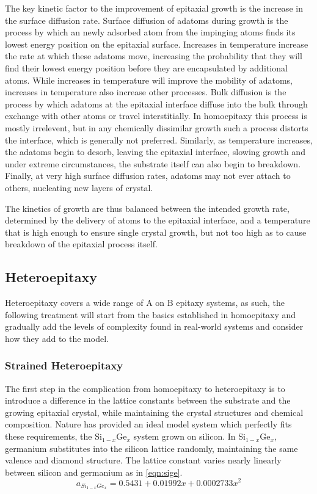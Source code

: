 The key kinetic factor to the improvement of epitaxial growth is the increase in the surface diffusion rate. Surface diffusion of adatoms during growth is the process by which an newly adsorbed atom from the impinging atoms finds its lowest energy position on the epitaxial surface. Increases in temperature increase the rate at which these adatoms move, increasing the probability that they will find their lowest energy position before they are encapsulated by additional atoms. While increases in temperature will improve the mobility of adatoms, increases in temperature also increase other processes. Bulk diffusion is the process by which adatoms at the epitaxial interface diffuse into the bulk through exchange with other atoms or travel interstitially. In homoepitaxy this process is mostly irrelevent, but in any chemically dissimilar growth such a process distorts the interface, which is generally not preferred. Similarly, as temperature increases, the adatoms begin to desorb, leaving the epitaxial interface, slowing growth and under extreme circumstances, the substrate itself can also begin to breakdown. Finally, at very high surface diffusion rates, adatoms may not ever attach to others, nucleating new layers of crystal.

The kinetics of growth are thus balanced between the intended growth rate, determined by the delivery of atoms to the epitaxial interface, and a temperature that is high enough to ensure single crystal growth, but not too high as to cause breakdown of the epitaxial process itself.

\subsection{Heteroepitaxy}
Heteroepitaxy covers a wide range of A on B epitaxy systems, as such, the following treatment will start from the basics established in homoepitaxy and gradually add the levels of complexity found in real-world systems and consider how they add to the model.

\subsubsection{Strained Heteroepitaxy}
The first step in the complication from homoepitaxy to heteroepitaxy is to introduce a difference in the lattice constants between the substrate and the growing epitaxial crystal, while maintaining the crystal structures and chemical composition. Nature has provided an ideal model system which perfectly fits these requirements, the Si$_{1-x}$Ge$_x$ system grown on silicon. In Si$_{1-x}$Ge$_x$, germanium substitutes into the silicon lattice randomly, maintaining the same valence and diamond structure. The lattice constant varies nearly linearly between silicon and germanium as in \cref{eqn:sige}.
\begin{equation}
a_{Si_{1-x}Ge_x} = 0.5431 + 0.01992x + 0.0002733x^2 \label{eqn:sige}
\end{equation}

